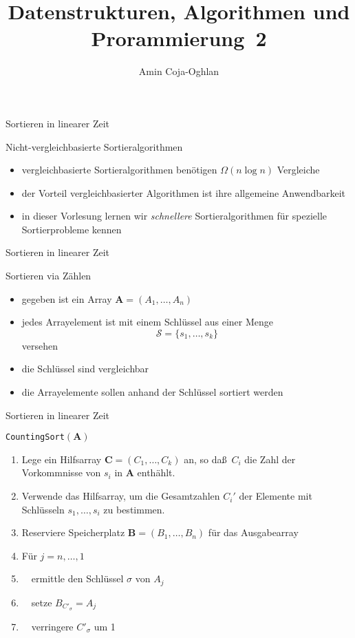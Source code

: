 \documentclass[aspectratio=1610, 11pt]{beamer}
\title{Datenstrukturen, Algorithmen und Prorammierung~2}
\author[A.~Coja-Oghlan]{Amin Coja-Oghlan}
\institute[DAP2]{Lehrstuhl Informatik 2\\Fakult\"at f\"ur Informatik}
\renewcommand{\vec}[1]{\boldsymbol{#1}}
\newcommand\cS{\mathcal S}
\newcommand\vA{\vec A}
\newcommand\vB{\vec B}
\newcommand\vC{\vec C}
\begin{document}
\maketitle

\begin{frame}{Sortieren in linearer Zeit}
	\begin{exampleblock}{Nicht-vergleichbasierte Sortieralgorithmen}
		\begin{itemize}
			\item vergleichbasierte Sortieralgorithmen ben\"otigen $\Omega(n\log n)$ Vergleiche
			\item der Vorteil vergleichbasierter Algorithmen ist ihre allgemeine Anwendbarkeit
			\item in dieser Vorlesung lernen wir \emph{schnellere} Sortieralgorithmen f\"ur spezielle Sortierprobleme kennen
		\end{itemize}
	\end{exampleblock}
\end{frame}

\begin{frame}{Sortieren in linearer Zeit}
	\begin{exampleblock}{Sortieren via Z\"ahlen}
		\begin{itemize}
			\item gegeben ist ein Array $\vA=(A_1,\ldots,A_n)$
			\item jedes Arrayelement ist mit einem \alert{Schl\"ussel} aus einer Menge
				$$\cS=\{s_1,\ldots,s_k\}$$
				versehen
			\item die Schl\"ussel sind vergleichbar
			\item die Arrayelemente sollen anhand der Schl\"ussel sortiert werden
		\end{itemize}
	\end{exampleblock}
\end{frame}

\begin{frame}{Sortieren in linearer Zeit}
	\begin{exampleblock}{{\tt CountingSort}$(\vA)$}
		\begin{enumerate}
			\item Lege ein Hilfsarray $\vC=(C_1,\ldots,C_k)$ an, so da\ss\ $C_i$ die Zahl der Vorkommnisse von $s_i$ in $\vA$ enth\"ahlt.
			\item Verwende das Hilfsarray, um die Gesamtzahlen $C_i'$ der Elemente mit Schl\"usseln $s_1,\ldots,s_i$ zu bestimmen.
			\item Reserviere Speicherplatz $\vB=(B_1,\ldots,B_n)$ f\"ur das Ausgabearray
			\item F\"ur $j=n,\ldots,1$
			\item $\quad$ermittle den Schl\"ussel $\sigma$ von $A_j$
			\item $\quad$setze $B_{C'_\sigma}=A_j$
			\item $\quad$verringere $C'_\sigma$ um 1
		\end{enumerate}
	\end{exampleblock}
\end{frame}
\end{document}
